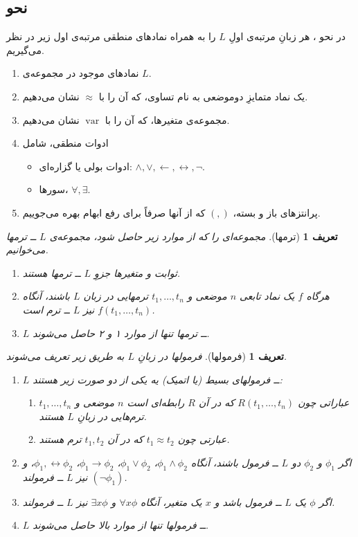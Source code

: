 \documentclass[12pt,a4paper]{report}
\theoremstyle{colorhead}
\newtheorem{defn}[thm]{تعریف}
\DeclareMathOperator{\var}{var}
\begin{document}
\subsection{نحو}
در نحو
،
هر زبانِ مرتبه‌‌ی اولِ
$L$
را به همراه
نمادهای منطقی 
مرتبه‌ی اول زیر 
در نظر می‌گیریم. 
\begin{enumerate}
\item 
نمادهای موجود در 
مجموعه‌ی 
$L$.
\item 
یک نماد متمایزِ دوموضعی به نام تساوی، که آن را با
$\approx$
نشان می‌دهیم.
\item 
 مجموعه‌ی  متغیرها، که آن را با 
$\var$
نشان می‌دهیم.
\item 
ادوات منطقی، شامل 
\begin{itemize}
\item 
ادوات بولی یا گزاره‌ای:
$\wedge,\vee, \leftarrow,\leftrightarrow, \neg$.
\item 
سورها،
$\forall,\exists$.
\end{itemize}
\item 
پرانتزهای باز و بسته، 
$(,)$
که از آنها صرفاً برای رفع ابهام بهره می‌جوییم.
\end{enumerate}
\begin{defn}[ترمها]
مجموعه‌ای را که از موارد زیر حاصل شود، مجموعه‌ی
$L$ ــ
\textit{ترمها}
 می‌خوانیم.
 \begin{enumerate}
 \item 
 ثوابت و متغیرها جزوِ
 $L$ ــ
 ترمها هستند.
 \item 
 هرگاه 
 $f$
 یک نماد تابعی
 $n$
 موضعی  و 
 $t_1,\ldots,t_n$
 ترمهایی در زبان
 $L$
 باشند،‌ آنگاه
 $f(t_1,\ldots,t_n)$
 نیز
 $L$
 ــ
 ترم است.
 \item 
 $L$ ــ
 ترمها تنها از 
 موارد ۱ و ۲ حاصل می‌شوند.
  \end{enumerate}
\end{defn}
\begin{defn}[فرمولها]
فرمولها در زبانِ 
$L$
به طریق زیر تعریف می‌شوند.
\begin{enumerate}
\item 
$L$ ــ
فرمولهای بسیط (یا اتمیک)
یه یکی از دو صورت زیر هستند:
\begin{enumerate}
\item 
عباراتی چون
$R(t_1,\ldots, t_n)$
که در آن
$R$
رابطه‌ای است
$n$
موضعی و 
$t_1,\ldots,t_n$
ترم‌هایی در زبانِ
$L$
هستند.
\item 
عبارتی چون
$t_1\approx t_2$
که در آن
$t_1,t_2$
ترم هستند.
\end{enumerate}
\item 
اگر
$\phi_1$
و
$\phi_2$
دو
$L$ ــ‌ 
فرمول باشند، آنگاه
$\phi_1\wedge \phi_2$،
$\phi_1\vee \phi_2$،
$\phi_1\to \phi_2$،
$\phi_1,\leftrightarrow\phi_2$،
و
$(\neg\phi_1)$
نیز 
$L$ ــ
فرمولند.
\item 
اگر
$\phi$
یک
$L$ ــ‌
فرمول باشد و 
$x$
یک متغیر، آنگاه
$\forall x \phi$
و
$\exists x\phi$
نیز
$L$
ــ فرمولند.
\item 
$L$ ــ
فرمولها تنها از موارد بالا حاصل می‌شوند.
\end{enumerate}
\end{defn}
\end{document}

